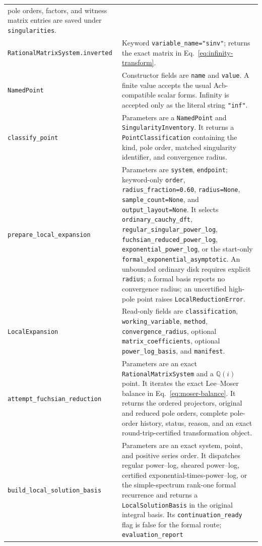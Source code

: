 \documentclass[11pt]{article}
\begin{document}
\begin{longtable}{L{0.36\textwidth}L{0.58\textwidth}}
pole orders, factors, and witness matrix entries are saved under \texttt{singularities}. \\
\texttt{RationalMatrixSystem.inverted} & Keyword \texttt{variable\_name="sinv"}; returns
the exact matrix in Eq.~\eqref{eq:infinity-transform}. \\
\texttt{NamedPoint} & Constructor fields are \texttt{name} and \texttt{value}.  A finite
value accepts the usual Acb-compatible scalar forms.  Infinity is accepted only as the
literal string \texttt{"inf"}. \\
\texttt{classify\_point} & Parameters are a \texttt{NamedPoint} and
\texttt{SingularityInventory}.  It returns a \texttt{PointClassification} containing the
kind, pole order, matched singularity identifier, and convergence radius. \\
\texttt{prepare\_local\_expansion} & Parameters are \texttt{system}, \texttt{endpoint};
keyword-only \texttt{order}, \texttt{radius\_fraction=0.60}, \texttt{radius=None},
\texttt{sample\_count=None}, and \texttt{output\_layout=None}.  It selects
\texttt{ordinary\_cauchy\_dft}, \texttt{regular\_singular\_power\_log},
\texttt{fuchsian\_reduced\_power\_log}, \texttt{exponential\_power\_log}, or the start-only
\texttt{formal\_exponential\_asymptotic}.  An unbounded ordinary disk requires explicit
\texttt{radius}; a formal basis reports no convergence radius; an uncertified high-pole
point raises \texttt{LocalReductionError}. \\
\texttt{LocalExpansion} & Read-only fields are \texttt{classification},
\texttt{working\_variable}, \texttt{method}, \texttt{convergence\_radius}, optional
\texttt{matrix\_coefficients}, optional \texttt{power\_log\_basis}, and \texttt{manifest}. \\
\texttt{attempt\_fuchsian\_reduction} & Parameters are an exact
\texttt{RationalMatrixSystem} and a $\mathbb Q(i)$ point.  It iterates the exact
Lee--Moser balance in Eq.~\eqref{eq:moser-balance}.  It returns the ordered projectors,
original and reduced pole orders, complete pole-order history, status, reason, and an exact
round-trip-certified transformation object. \\
\texttt{build\_local\_solution\_basis} & Parameters are an exact system, point, and positive
series order.  It dispatches regular power--log, sheared power--log, certified
exponential-times-power--log, or the simple-spectrum rank-one formal recurrence and returns a
\texttt{LocalSolutionBasis} in the original integral basis.  Its
\texttt{continuation\_ready} flag is false for the formal route; \texttt{evaluation\_report}

\end{longtable}
\end{document}
